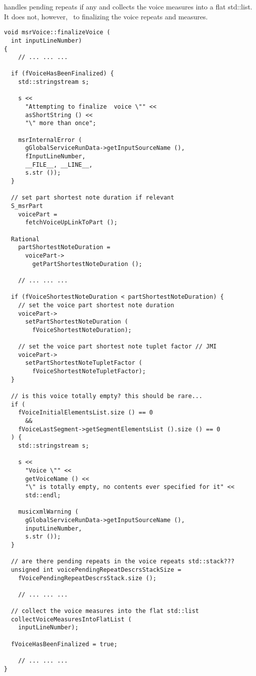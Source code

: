  handles pending repeats if any and collects the voice measures into a flat std::list. It does not, however, \cascade\ to finalizing the voice repeats and measures.
\begin{lstlisting}[language=CPlusPlus]
void msrVoice::finalizeVoice (
  int inputLineNumber)
{
	// ... ... ...

  if (fVoiceHasBeenFinalized) {
    std::stringstream s;

    s <<
      "Attempting to finalize  voice \"" <<
      asShortString () <<
      "\" more than once";

    msrInternalError (
      gGlobalServiceRunData->getInputSourceName (),
      fInputLineNumber,
      __FILE__, __LINE__,
      s.str ());
  }

  // set part shortest note duration if relevant
  S_msrPart
    voicePart =
      fetchVoiceUpLinkToPart ();

  Rational
    partShortestNoteDuration =
      voicePart->
        getPartShortestNoteDuration ();

	// ... ... ...

  if (fVoiceShortestNoteDuration < partShortestNoteDuration) {
    // set the voice part shortest note duration
    voicePart->
      setPartShortestNoteDuration (
        fVoiceShortestNoteDuration);

    // set the voice part shortest note tuplet factor // JMI
    voicePart->
      setPartShortestNoteTupletFactor (
        fVoiceShortestNoteTupletFactor);
  }

  // is this voice totally empty? this should be rare...
  if (
    fVoiceInitialElementsList.size () == 0
      &&
    fVoiceLastSegment->getSegmentElementsList ().size () == 0
  ) {
    std::stringstream s;

    s <<
      "Voice \"" <<
      getVoiceName () <<
      "\" is totally empty, no contents ever specified for it" <<
      std::endl;

    musicxmlWarning (
      gGlobalServiceRunData->getInputSourceName (),
      inputLineNumber,
      s.str ());
  }

  // are there pending repeats in the voice repeats std::stack???
  unsigned int voicePendingRepeatDescrsStackSize =
    fVoicePendingRepeatDescrsStack.size ();

	// ... ... ...

  // collect the voice measures into the flat std::list
  collectVoiceMeasuresIntoFlatList (
    inputLineNumber);

  fVoiceHasBeenFinalized = true;

	// ... ... ...
}
\end{lstlisting}


